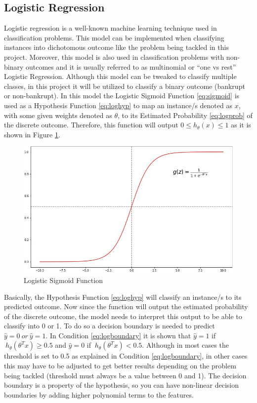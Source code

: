 \subsection{Logistic Regression}\label{ssec:logreg}

Logistic regression \cite{mckelvey1975statistical} is a well-known machine learning technique used in classification problems. This model can be implemented when classifying instances \cite{timmerman2005logistic} into dichotomous outcome like the problem being tackled in this project. Moreover, this model is also used in classification problems with non-binary outcomes \cite{debella2009spatial} and it is usually referred to as multinomial or “one vs rest” Logistic Regression. Although this model can be tweaked to classify multiple classes, in this project it will be utilized to classify a binary outcome (bankrupt or non-bankrupt). In this model the Logistic Sigmoid Function \eqref{eq:sigmoid} is used as a Hypothesis Function \eqref{eq:loghyp} to map an instance/s denoted as \(x\), with some given weights denoted as \(\theta\), to its Estimated Probability \eqref{eq:logprob} of the discrete outcome. Therefore, this function will output \(0 \leq h_\theta(x) \leq 1 \) as it is shown in Figure \ref{fig:log_func}. 
\begin{figure}[H]
\centering
  \includegraphics[scale = 0.5]{imgs/sigmoid_function.JPG}
  \caption{Logistic Sigmoid Function}
  \label{fig:log_func}
\end{figure}
\noindent Basically, the Hypothesis Function \eqref{eq:loghyp} will classify an instance/s to its predicted outcome.  Now since the function will output the estimated probability of the discrete outcome, the model needs to interpret this output to be able to classify into 0 or 1. To do so a decision boundary is needed to predict \(\hat{y} = 0 \ or\ \hat{y} = 1 \). In Condition \eqref{eq:logboundary} it is shown that  \(\hat{y} = 1\) if \(\ h_\theta(\theta^T x) \geq 0.5 \) and \(\hat{y} = 0\) if \(\ h_\theta(\theta^T x) < 0.5 \). Although in most cases the threshold is set to 0.5 as explained in Condition \eqref{eq:logboundary}, in other cases this may have to be adjusted to get better results depending on the problem being tackled (threshold must always be a value between 0 and 1). The decision boundary is a property of the hypothesis, so you can have non-linear decision boundaries by adding higher polynomial terms to the features.
